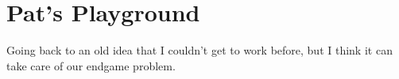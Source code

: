 \documentclass{patmorin}
\DeclareMathOperator{\dist}{dist}
\begin{document}
\section{Pat's Playground}

Going back to an old idea that I couldn't get to work before, but I think it can take care of our endgame problem.






\end{document}
